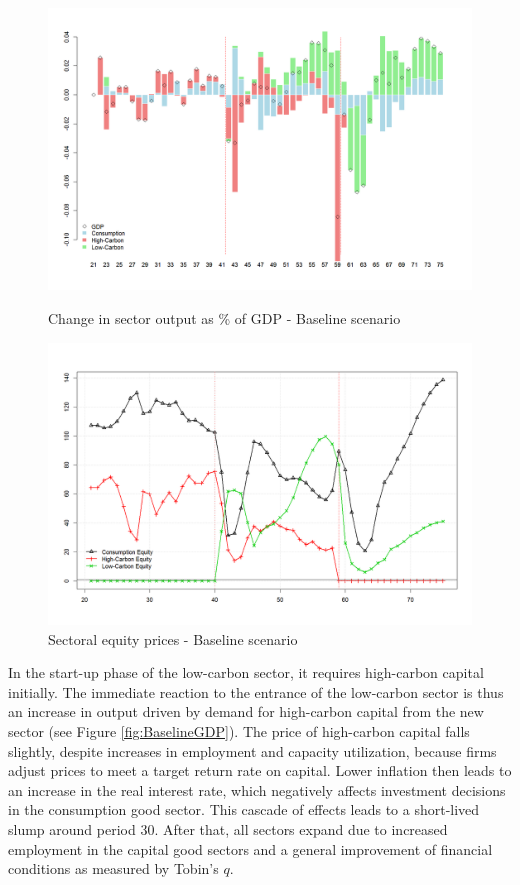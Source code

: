 \documentclass[authoryear]{article}
\begin{document}
\begin{figure} %
\centering
\includegraphics[width=\linewidth]{Figures/baselineGDP.png}
\caption{Change in sector output as \% of GDP - Baseline scenario} 
\label{fig:BaselineGDP}
\includegraphics[width=\linewidth]{Figures/baselineEquityPrice.png}
\caption{Sectoral equity prices - Baseline scenario}
\label{fig:BaseEqPrice}
\end{figure}
In the start-up phase of the low-carbon sector, it requires high-carbon capital initially. The immediate reaction to the entrance of the low-carbon sector is thus an increase in output driven by demand for high-carbon capital from the new sector (see Figure \ref{fig:BaselineGDP}). The price of high-carbon capital falls slightly, despite increases in employment and capacity utilization, because firms adjust prices to meet a target return rate on capital. Lower inflation then leads to an increase in the real interest rate, which negatively affects investment decisions in the consumption good sector. This cascade of effects leads to a short-lived slump around period 30. After that, all sectors expand due to increased employment in the capital good sectors and a general improvement of financial conditions as measured by Tobin’s $q$.
\end{document}

